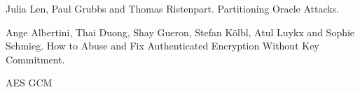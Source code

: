 \begin{hangparas}{1em}{1}

    Julia Len, Paul Grubbs and Thomas Ristenpart. Partitioning Oracle Attacks.



    Ange Albertini, Thai Duong, Shay Gueron, Stefan Kölbl, Atul Luykx and Sophie Schmieg. How to Abuse and Fix Authenticated Encryption Without Key Commitment.


    AES GCM
\end{hangparas}
